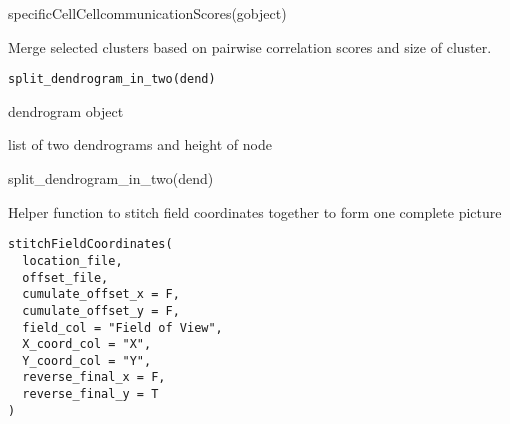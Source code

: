 \documentclass[a4paper]{book}
\begin{document}
%
\begin{Examples}
\begin{ExampleCode}
    specificCellCellcommunicationScores(gobject)
\end{ExampleCode}
\end{Examples}
%
\begin{Description}\relax
Merge selected clusters based on pairwise correlation scores and size of cluster.
\end{Description}
%
\begin{Usage}
\begin{verbatim}
split_dendrogram_in_two(dend)
\end{verbatim}
\end{Usage}
%
\begin{Arguments}
\begin{ldescription}
\item[\code{dend}] dendrogram object
\end{ldescription}
\end{Arguments}
%
\begin{Value}
list of two dendrograms and height of node
\end{Value}
%
\begin{Examples}
\begin{ExampleCode}
    split_dendrogram_in_two(dend)
\end{ExampleCode}
\end{Examples}
%
\begin{Description}\relax
Helper function to stitch field coordinates together to form one complete picture
\end{Description}
%
\begin{Usage}
\begin{verbatim}
stitchFieldCoordinates(
  location_file,
  offset_file,
  cumulate_offset_x = F,
  cumulate_offset_y = F,
  field_col = "Field of View",
  X_coord_col = "X",
  Y_coord_col = "Y",
  reverse_final_x = F,
  reverse_final_y = T
)
\end{verbatim}
\end{Usage}
%
\end{document}
